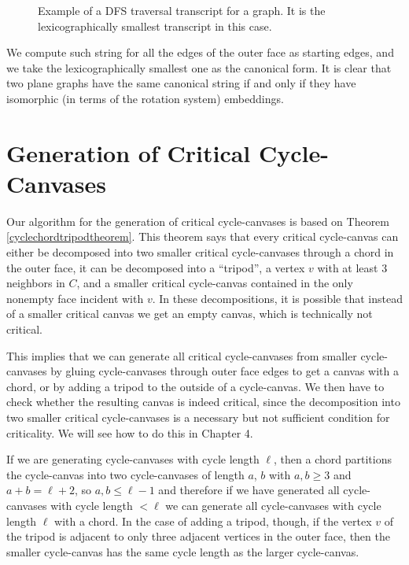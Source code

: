 \begin{figure}
\centering
\begin{tikzpicture}[main/.style = {draw, circle, fill=white}]

\end{tikzpicture}
\caption{Example of a DFS traversal transcript for a graph. It is the lexicographically smallest transcript in this case.}
\end{figure}


We compute such string for all the edges of the outer face as starting edges, and we take the lexicographically smallest one as the canonical form. It is clear that
two plane graphs have the same canonical string if and only if they have isomorphic (in terms of the rotation system) embeddings. 


\section{Generation of Critical Cycle-Canvases}

Our algorithm for the generation of critical cycle-canvases is based on Theorem \ref{cyclechordtripodtheorem}. 
This theorem says that every critical cycle-canvas can either be decomposed into two smaller critical 
cycle-canvases through a chord in the outer face, it can be decomposed into a ``tripod'', a vertex $v$ 
with at least $3$ neighbors in $C$, and a smaller critical cycle-canvas contained in the only nonempty 
face incident with $v$. In these decompositions, it is possible that instead of a smaller critical canvas 
we get an empty canvas, which is technically not critical. 

This implies that we can generate all critical cycle-canvases from smaller cycle-canvases by gluing
cycle-canvases through outer face edges to get a canvas with a chord, or by adding a tripod to the
outside of a cycle-canvas. We then have to check whether the resulting canvas is indeed critical,
since the decomposition into two smaller critical cycle-canvases is a necessary but not sufficient condition
for criticality. We will see how to do this in Chapter 4.



If we are generating cycle-canvases with cycle length $\ell$, then a chord partitions
the cycle-canvas into two cycle-canvases of length $a$, $b$ with $a, b \geq 3$ and $a + b = \ell + 2$, so 
$a, b \leq \ell-1$ and therefore if we have generated all cycle-canvases with cycle length $< \ell$ we can generate
all cycle-canvases with cycle length $\ell$ with a chord. In the case of adding a tripod, though, if the vertex $v$ of
the tripod is adjacent to only three adjacent vertices in the outer face, then the smaller cycle-canvas has the same
cycle length as the larger cycle-canvas.

